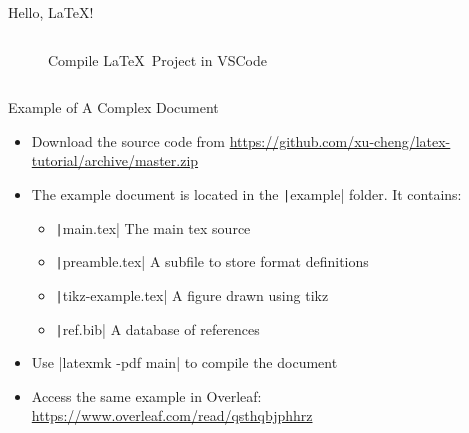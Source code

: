 \documentclass[xcolor={dvipsnames},aspectratio=169,10pt]{beamer}
\begin{document}
\begin{frame}[fragile]{Hello, \LaTeX!}
\begin{columns}
\begin{column}{.3\linewidth}
\begin{figure}
        \caption{Compile \LaTeX~Project in VSCode}
      \end{figure}
    \end{column}
  \end{columns}
\end{frame}

\begin{frame}[fragile]{Example of A Complex Document}
  \begin{itemize}
    \item Download the source code from \url{https://github.com/xu-cheng/latex-tutorial/archive/master.zip}
    \item The example document is located in the \texttt|example| folder. It contains:
          \begin{itemize}
            \item \texttt|main.tex| The main tex source
            \item \texttt|preamble.tex| A subfile to store format definitions
            \item \texttt|tikz-example.tex| A figure drawn using tikz
            \item \texttt|ref.bib| A database of references
          \end{itemize}
    \item Use \bashinline|latexmk -pdf main| to compile the document
    \item Access the same example in Overleaf: \url{https://www.overleaf.com/read/qsthqbjphhrz}
  \end{itemize}
\end{frame}
\end{document}
